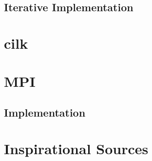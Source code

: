 \documentclass[12pt,a4paper,titlepage,oneside]{scrartcl}
\begin{document}
	\subsection{Iterative Implementation}
	
	
\section{cilk}

\section{MPI}
	\subsection{Implementation}
	
\pagebreak
\section{Inspirational Sources}
	 
%
%
\end{document}
